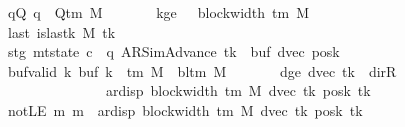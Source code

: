 \begin{isabellebody}
\ \ \ \ \ \ \ qQ{\isacharcolon}{\kern0pt}\ {\isachardoublequoteopen}q\ {\isasymin}\ Q{\isacharunderscore}{\kern0pt}tm\ M{\isachardoublequoteclose}\isanewline
\ \ \ \ \ \ \ kge{}{\isacharcolon}{\kern0pt}\ {\isachardoublequoteopen}{}\ {\isasymle}\ block{\isacharunderscore}{\kern0pt}width\ {\isacharparenleft}{\kern0pt}{\isasymGamma}{\isacharunderscore}{\kern0pt}tm\ M{\isacharparenright}{\kern0pt}{\isachardoublequoteclose}\isanewline
\ \ \ \ \ \ \ last{\isacharcolon}{\kern0pt}\ {\isachardoublequoteopen}is{\isacharunderscore}{\kern0pt}last{\isacharunderscore}{\kern0pt}k\ M\ tk{\isachardoublequoteclose}\isanewline
\ \ \ \ \ \ \ stg{\isacharcolon}{\kern0pt}\ {\isachardoublequoteopen}mt{\isacharunderscore}{\kern0pt}state\ c{}\ {\isacharequal}{\kern0pt}\ {\isacharparenleft}{\kern0pt}q{\isacharcomma}{\kern0pt}\ AR{\isacharunderscore}{\kern0pt}SimAdvance{\isacharcomma}{\kern0pt}\ tk{\isacharcomma}{\kern0pt}\ {}{\isacharcomma}{\kern0pt}\ buf{\isacharcomma}{\kern0pt}\ dvec{\isacharcomma}{\kern0pt}\ posk{\isacharparenright}{\kern0pt}{\isachardoublequoteclose}\isanewline
\ \ \ \ \ \ \ buf{\isacharunderscore}{\kern0pt}valid{\isacharcolon}{\kern0pt}\ {\isachardoublequoteopen}{\isasymforall}k{\isachardot}{\kern0pt}\ buf\ k\ {\isasymin}\ {\isasymGamma}{\isacharunderscore}{\kern0pt}tm\ M\ {\isasymunion}\ {\isacharbraceleft}{\kern0pt}bl{\isacharunderscore}{\kern0pt}tm\ M{\isacharbraceright}{\kern0pt}{\isachardoublequoteclose}\isanewline
\ \ \ \ \ \ \ dge{}{\isacharcolon}{\kern0pt}\ {\isachardoublequoteopen}dvec\ tk\ {\isasymnoteq}\ dir{\isachardot}{\kern0pt}R\isanewline
\ \ \ \ \ \ \ \ \ \ \ \ \ \ \ \ \ \ {\isasymLongrightarrow}\ {}\ {\isacharless}{\kern0pt}\ ar{\isacharunderscore}{\kern0pt}disp\ {\isacharparenleft}{\kern0pt}block{\isacharunderscore}{\kern0pt}width\ {\isacharparenleft}{\kern0pt}{\isasymGamma}{\isacharunderscore}{\kern0pt}tm\ M{\isacharparenright}{\kern0pt}{\isacharparenright}{\kern0pt}\ {\isacharparenleft}{\kern0pt}dvec\ tk{\isacharparenright}{\kern0pt}\ {\isacharparenleft}{\kern0pt}posk\ tk{\isacharparenright}{\kern0pt}{\isachardoublequoteclose}\isanewline
\ \ \ \ \ \ \ notLE{\isacharcolon}{\kern0pt}\ {\isachardoublequoteopen}{\isasymAnd}m{\isachardot}{\kern0pt}\ m\ {\isacharless}{\kern0pt}\ ar{\isacharunderscore}{\kern0pt}disp\ {\isacharparenleft}{\kern0pt}block{\isacharunderscore}{\kern0pt}width\ {\isacharparenleft}{\kern0pt}{\isasymGamma}{\isacharunderscore}{\kern0pt}tm\ M{\isacharparenright}{\kern0pt}{\isacharparenright}{\kern0pt}\ {\isacharparenleft}{\kern0pt}dvec\ tk{\isacharparenright}{\kern0pt}\ {\isacharparenleft}{\kern0pt}posk\ tk{\isacharparenright}{\kern0pt}\isanewline

\end{isabellebody}
